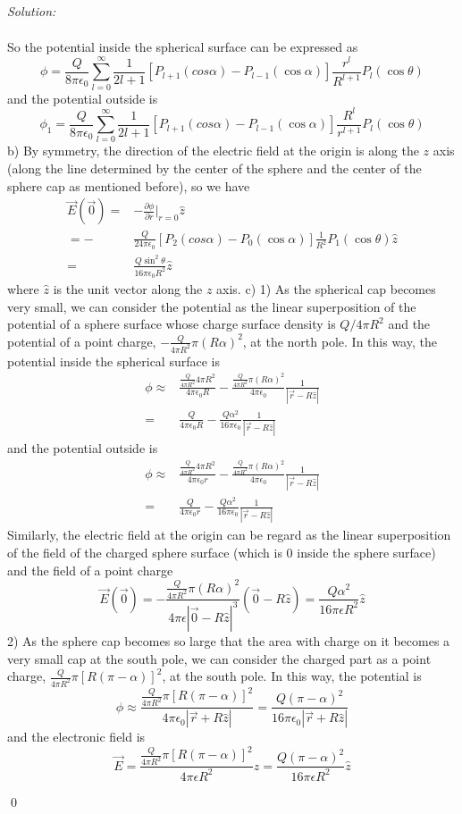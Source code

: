 \documentclass[12pt]{article}
\newenvironment{sol}
    {\emph{Solution:}
    }
    {
    \qed
    }
\begin{document}
\begin{sol}
\begin{align*}
\end{align*}
So the potential inside the spherical surface can be expressed as
\[
\phi=\frac{Q}{8\pi\epsilon_0}\sum_{l=0}^{\infty}\frac{1}{2l+1}[P_{l+1}(cos\alpha)-P_{l-1}(\cos\alpha)]\frac{r^l}{R^{l+1}}P_l(\cos\theta)
\]
and the potential outside is
\[
\phi_1=\frac{Q}{8\pi\epsilon_0}\sum_{l=0}^{\infty}\frac{1}{2l+1}[P_{l+1}(cos\alpha)-P_{l-1}(\cos\alpha)]\frac{R^l}{r^{l+1}}P_l(\cos\theta)
\]
b) By symmetry, the direction of the electric field at the origin is along the $z$ axis (along the line determined by the center of the sphere and the center of the sphere cap as mentioned before), so we have
\begin{align*}
\vec{E}(\vec{0})=&-\frac{\partial\phi}{\partial r}|_{r=0}\hat{z}\\
=-&\frac{Q}{24\pi\epsilon_0}[P_{2}(cos\alpha)-P_{0}(\cos\alpha)]\frac{1}{R^2}P_1(\cos\theta)\hat{z}\\
=&\frac{Q\sin^2\theta}{16\pi\epsilon_0R^2}\hat{z}
\end{align*}
where $\hat{z}$ is the unit vector along the $z$ axis.
c) 1) As the spherical cap becomes very small, we can consider the potential as the linear superposition of the potential of a sphere surface whose charge surface density is $Q/4\pi R^2$ and the potential of a point charge, $-\frac{Q}{4\pi R^2}\pi(R\alpha)^2$, at the north pole. In this way, the potential inside the spherical surface is
\begin{align*}
\phi\approx&\frac{\frac{Q}{4\pi R^2}4\pi R^2}{4\pi\epsilon_0R}-\frac{\frac{Q}{4\pi R^2}\pi(R\alpha)^2}{4\pi\epsilon_0}\frac{1}{|\vec{r}-R\hat{z}|}\\
=&\frac{Q}{4\pi\epsilon_0R}-\frac{Q\alpha^2}{16\pi\epsilon_0}\frac{1}{|\vec{r}-R\hat{z}|}
\end{align*}
and the potential outside is
\begin{align*}
\phi\approx&\frac{\frac{Q}{4\pi R^2}4\pi R^2}{4\pi\epsilon_0r}-\frac{\frac{Q}{4\pi R^2}\pi(R\alpha)^2}{4\pi\epsilon_0}\frac{1}{|\vec{r}-R\hat{z}|}\\
=&\frac{Q}{4\pi\epsilon_0r}-\frac{Q\alpha^2}{16\pi\epsilon_0}\frac{1}{|\vec{r}-R\hat{z}|}
\end{align*}
Similarly, the electric field at the origin can be regard as the linear superposition of the field of the charged sphere surface (which is $0$ inside the sphere surface) and the field of a point charge
\[
\vec{E}(\vec{0})=-\frac{\frac{Q}{4\pi R^2}\pi(R\alpha)^2}{4\pi\epsilon|\vec{0}-R\hat{z}|^3}(\vec{0}-R\hat{z})=\frac{Q\alpha^2}{16\pi\epsilon R^2}\hat{z}
\]
2) As the sphere cap becomes so large that the area with charge on it becomes a very small cap at the south pole, we can consider the charged part as a point charge, $\frac{Q}{4\pi R^2}\pi[R(\pi-\alpha)]^2$, at the south pole. In this way, the potential is
\[
\phi\approx\frac{\frac{Q}{4\pi R^2}\pi[R(\pi-\alpha)]^2}{4\pi\epsilon_0|\vec{r}+R\hat{z}|}=\frac{Q(\pi-\alpha)^2}{16\pi\epsilon_0|\vec{r}+R\hat{z}|}
\]
and the electronic field is
\[
\vec{E}=\frac{\frac{Q}{4\pi R^2}\pi[R(\pi-\alpha)]^2}{4\pi\epsilon R^2}\hat{z}=\frac{Q(\pi-\alpha)^2}{16\pi\epsilon R^2}\hat{z}
\]
\end{sol}
\end{document}
